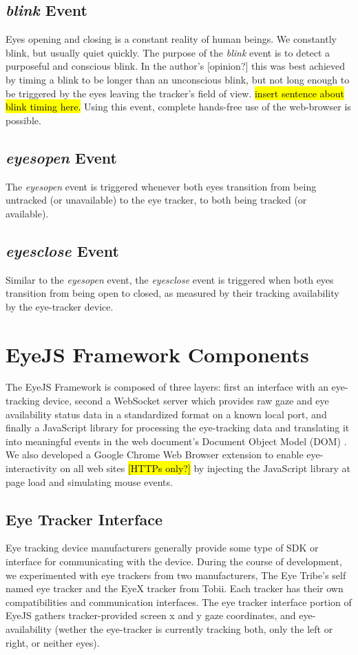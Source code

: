\documentclass{sigchi}
\begin{document}
\subsection{\textbf{\textit{blink}} Event}
Eyes opening and closing is a constant reality of human beings. We
constantly blink, but usually quiet quickly. The purpose of the 
\textit{blink} event is to detect a purposeful and conscious blink. 
In the author's [opinion?] this was best achieved by timing a blink
to be longer than an unconscious blink, but not long enough to be 
triggered by the eyes leaving the tracker's field of view. \hl{insert
sentence about blink timing here.} Using this event, complete 
hands-free use of the web-browser is possible.

\subsection{\textbf{\textit{eyesopen}} Event}
The \textit{eyesopen} event is triggered whenever both eyes transition
from being untracked (or unavailable) to the eye tracker, to both
being tracked (or available).

\subsection{\textbf{\textit{eyesclose}} Event}
Similar to the \textit{eyesopen} event, the \textit{eyesclose} event
is triggered when both eyes transition from being open to closed, as
measured by their tracking availability by the eye-tracker device.



\section{EyeJS Framework Components}
The EyeJS Framework is composed of three layers: first
an interface with an eye-tracking device, second a WebSocket server 
\cite{websocket} which provides raw gaze and eye availability
status data in a standardized format on a known local port, and finally
a JavaScript library for processing the eye-tracking data and
translating it into meaningful events in the web document's Document
Object Model (DOM) \cite{domlevel1, domlevel2}. We also developed a Google
Chrome Web Browser extension \cite{chromeextensions} to enable
eye-interactivity on all web sites \hl{[HTTPs only?]} by injecting
the JavaScript library at page load and simulating mouse events.


\subsection{Eye Tracker Interface}
Eye tracking device manufacturers generally provide some type of SDK or
interface for communicating with the device. During the course of
development, we experimented with eye trackers from two manufacturers,
The Eye Tribe's self named eye tracker and the EyeX tracker from Tobii.
Each tracker has their own compatibilities and communication interfaces.
The eye tracker interface portion of EyeJS gathers tracker-provided
screen x and y gaze coordinates, and eye-availability (wether the
eye-tracker is currently tracking both, only the left or right, or
neither eyes).
\end{document}
